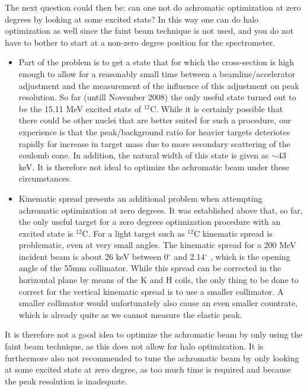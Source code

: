 \documentclass[11pt]{report}
\begin{document}
\noindent The next question could then be: can one not do 
achromatic optimization at zero degrees by looking at some
excited state? In this way one can do halo optimization as well
since the faint beam technique is not used, and you do not have 
to bother to start at a non-zero degree position for the spectrometer.

\begin{itemize}
\item Part of the problem is to get a state that for which the 
cross-section is high enough to allow for a reasonably small time
between a beamline/accelerator adjustment and the measurement of
the influence of this adjustment on peak resolution.
So far (untill November 2008) the only useful state turned out to be 
the 15.11 MeV excited state of $^{12}$C.
While it is certainly possible that there could be other nuclei that are better
suited for such a procedure, our experience is that the peak/background ratio
for heavier targets deteriotes rapidly for increase in target mass due to
more secondary scattering of the coulomb cone.
In addition, the natural width of this state is given as $\sim$43 keV.
It is therefore not ideal to optimize the achromatic beam under these
circumstances.

\item Kinematic spread presents an additional problem when attempting achromatic 
optimization at zero degrees. It was established above that, so far, the only 
useful target for a zero degrees optimization procedure with an excited state is $^{12}$C.
For a light target such as  $^{12}$C kinematic spread is problematic,
even at very small angles. The kinematic spread for a 200 MeV incident beam is  
about 26 keV between 0$^{\circ}$ and 2.14$^{\circ}$ , which
is the opening angle of the 55mm collimator. 
While this spread can be corrected in the horizontal plane
by means of the K and H coils, the only thing to be done to correct
for the vertical kinematic spread is to use a smaller collimator. A smaller collimator
would unfortunately also cause an even smaller countrate, which is already 
quite as we cannot measure the elastic peak. 
\end{itemize}

\noindent It is therefore not a good idea to optimize the achromatic beam by only
using the faint beam technique, as this does not allow for halo optimization.
It is furthermore also not recommended to
tune the achromatic beam by only looking at some excited state at zero degree,
as too much time is required and because the peak resolution is inadequate.
\end{document}
